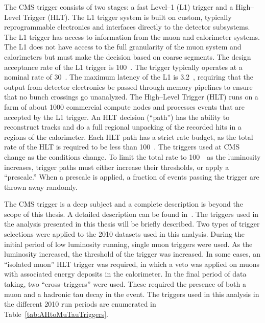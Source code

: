 The CMS trigger consists of two stages: a fast Level--1 (L1) trigger and a
High--Level Trigger (HLT).  The L1 trigger system is built on custom, typically
reprogrammable electronics and interfaces directly to the detector subsystems.
The L1 trigger has access to information from the muon and calorimeter systems.
The L1 does not have access to the full granularity of the muon system and
calorimeters but must make the decision based on coarse segments.  The design
acceptance rate of the L1 trigger is 100~\kilo\hertz.  The trigger typically
operates at a nominal rate of 30~\kilo\hertz.  The maximum latency of the L1 is
3.2~\micro\second, requiring that the output from detector electronics be passed
through memory pipelines to ensure that no bunch crossings go unanalyzed.  The
High--Level Trigger (HLT) runs on a farm of about 1000 commercial compute nodes
and processes events that are accepted by the L1 trigger.  An HLT decision
(``path'') has the ability to reconstruct tracks and do a full regional
unpacking of the recorded hits in a regions of the calorimeter.  Each HLT path
has a strict rate budget, as the total rate of the HLT is required to be less
than 100~\hertz.  The triggers used at CMS change as the conditions change.  To
limit the total rate to 100~\hertz~as the luminosity increases, trigger paths
must either increase their thresholds, or apply a ``prescale.'' When a prescale
is applied, a fraction of events passing the trigger are thrown away randomly.

The CMS trigger is a deep subject and a complete description is beyond the scope
of this thesis.  A detailed description can be found in~\cite{CMS-PTDRI}. The
triggers used in the analysis presented in this thesis will be briefly
described.  Two types of trigger selections were applied to the 2010 datasets
used in this analysis.  During the initial period of low luminosity running,
single muon triggers were used.  As the luminosity increased, the \pt threshold
of the trigger was increased.  In some cases, an ``isolated muon'' HLT trigger
was required, in which a veto was applied on muons with associated energy
deposits in the calorimeter.  In the final period of data taking, two
``cross--triggers'' were used.  These required the presence of both a muon and a
hadronic tau decay in the event.  The triggers used in this analysis in the
different 2010 run periods are enumerated in Table~\ref{tab:AHtoMuTauTriggers}.

